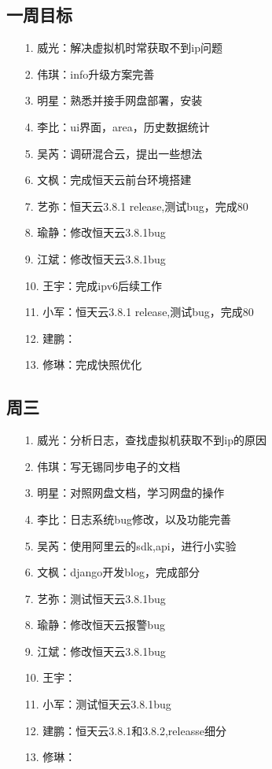 \documentclass[a4paper,left=1.5cm,right=1.5cm,11pt]{article}
\begin{document}
\tableofcontents

\clearpage

\subsection{一周目标}
	\begin{itemize}
        \item[1.]威光：解决虚拟机时常获取不到ip问题 
		\item[2.]伟琪：info升级方案完善
		\item[3.]明星：熟悉并接手网盘部署，安装
		\item[4.]李比：ui界面，area，历史数据统计
		\item[5.]吴芮：调研混合云，提出一些想法
		\item[6.]文枫：完成恒天云前台环境搭建
		\item[7.]艺弥：恒天云3.8.1 release,测试bug，完成80%
		\item[8.]瑜静：修改恒天云3.8.1bug
		\item[9.]江斌：修改恒天云3.8.1bug
		\item[10.]王宇：完成ipv6后续工作
		\item[11.]小军：恒天云3.8.1 release,测试bug，完成80%
		\item[12.]建鹏：
		\item[13.]修琳：完成快照优化
    \end{itemize}
\subsection{周三}
    \begin{itemize}
       \item[1.]威光：分析日志，查找虚拟机获取不到ip的原因
		\item[2.]伟琪：写无锡同步电子的文档
		\item[3.]明星：对照网盘文档，学习网盘的操作
		\item[4.]李比：日志系统bug修改，以及功能完善
		\item[5.]吴芮：使用阿里云的sdk,api，进行小实验
		\item[6.]文枫：django开发blog，完成部分
		\item[7.]艺弥：测试恒天云3.8.1bug
		\item[8.]瑜静：修改恒天云报警bug
		\item[9.]江斌：修改恒天云3.8.1bug
		\item[10.]王宇：
		\item[11.]小军：测试恒天云3.8.1bug
		\item[12.]建鹏：恒天云3.8.1和3.8.2,releasse细分
		\item[13.]修琳：
    \end{itemize}
\end{document}
